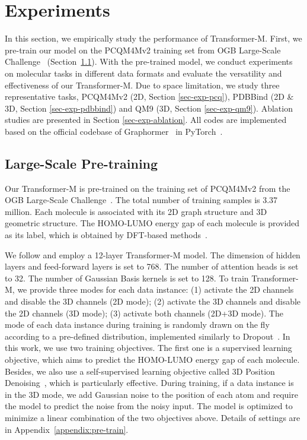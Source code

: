 \documentclass{article} \usepackage[dvipsnames]{xcolor}
\begin{document}
\vspace{-6pt}
\section{Experiments}
\label{sec-exp}
\vspace{-6pt}
In this section, we empirically study the performance of Transformer-M. First, we pre-train our model on the PCQM4Mv2 training set from OGB Large-Scale Challenge~\citep{hu2021ogb} (Section~\ref{sec-exp-pretrain}). With the pre-trained model, we conduct experiments on molecular tasks in different data formats and evaluate the versatility and effectiveness of our Transformer-M. Due to space limitation, we study three representative tasks,  PCQM4Mv2 (2D, Section \ref{sec-exp-pcq}), PDBBind (2D \& 3D, Section \ref{sec-exp-pdbbind}) and QM9 (3D, Section \ref{sec-exp-qm9}). Ablation studies are presented in Section \ref{sec-exp-ablation}. All codes are implemented based on the official codebase of Graphormer~\citep{ying2021transformers} in PyTorch~\citep{paszke2019pytorch}.

\vspace{-4pt}
\subsection{Large-Scale Pre-training}
\label{sec-exp-pretrain}
\vspace{-4pt}
Our Transformer-M is pre-trained on the training set of PCQM4Mv2 from the OGB Large-Scale Challenge~\citep{hu2021ogb}. The total number of training samples is 3.37 million. Each molecule is associated with its 2D graph structure and 3D geometric structure. The HOMO-LUMO energy gap of each molecule is provided as its label, which is obtained by DFT-based methods~\citep{burke2012perspective}. 

We follow \citet{ying2021transformers} and employ a 12-layer Transformer-M model. The dimension of hidden layers and feed-forward layers is set to 768. The number of attention heads is set to 32. The number of Gaussian Basis kernels is set to 128. To train Transformer-M, we provide three modes for each data instance: (1) activate the 2D channels and disable the 3D channels (2D mode); (2) activate the 3D channels and disable the 2D channels (3D mode); (3) activate both channels (2D+3D mode). The mode of each data instance during training is randomly drawn on the fly according to a pre-defined distribution, implemented similarly to Dropout~\citep{srivastava2014dropout}. In this work, we use two training objectives. The first one is a supervised learning objective, which aims to predict the HOMO-LUMO energy gap of each molecule. Besides, we also use a self-supervised learning objective called 3D Position Denoising~\citep{godwin2022simple,zaidi2022pre}, which is particularly effective. During training, if a data instance is in the 3D mode, we add Gaussian noise to the position of each atom and require the model to predict the noise from the noisy input. The model is optimized to minimize a linear combination of the two objectives above. Details of settings are in Appendix~\ref{appendix:pre-train}.
\vspace{-8pt}
\end{document}
